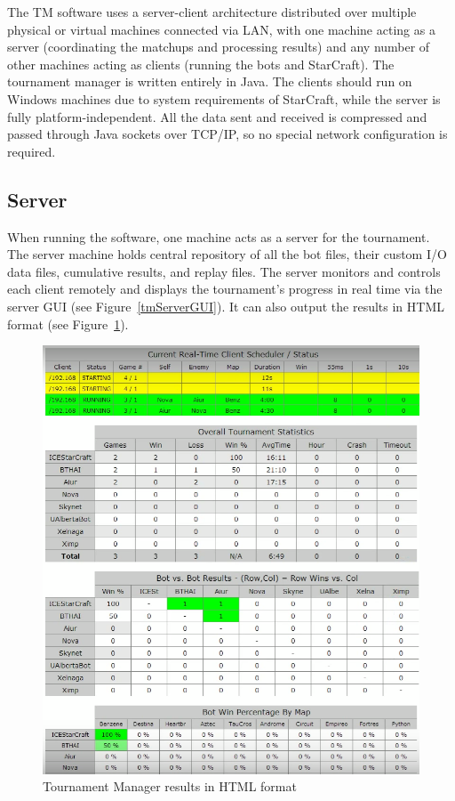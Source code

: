The TM software uses a server-client architecture distributed over multiple physical or virtual machines connected via LAN, with one machine acting as a server (coordinating the matchups and processing results) and any number of other machines acting as clients (running the bots and StarCraft). The tournament manager is written entirely in Java. The clients should run on Windows machines due to system requirements of StarCraft, while the server is fully platform-independent. All the data sent and received is compressed and passed through Java sockets over TCP/IP, so no special network configuration is required.

\subsection{Server}

When running the software, one machine acts as a server for the tournament. The server machine holds central repository of all the bot files, their custom I/O data files, cumulative results, and replay files. The server monitors and controls each client remotely and displays the tournament's progress in real time via the server GUI (see Figure~\ref{tmServerGUI}). It can also output the results in HTML format (see Figure~\ref{tmServerHTML}).

\begin{figure}[t]
  \centering
  \includegraphics[width=1\columnwidth]{fig/tournament-manager-screenshot2.png}
  \caption{Tournament Manager results in HTML format}
  \label{tmServerHTML}
\end{figure}

